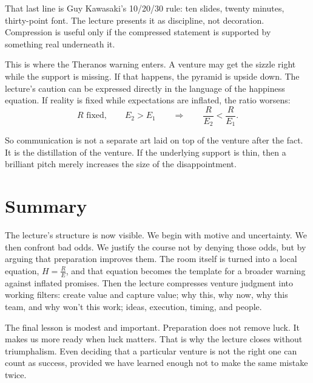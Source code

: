 That last line is Guy Kawasaki's 10/20/30 rule: ten slides, twenty minutes, thirty-point font. The lecture presents it as discipline, not decoration. Compression is useful only if the compressed statement is supported by something real underneath it.

This is where the Theranos warning enters. A venture may get the sizzle right while the support is missing. If that happens, the pyramid is upside down. The lecture's caution can be expressed directly in the language of the happiness equation. If reality is fixed while expectations are inflated, the ratio worsens:
\begin{equation}
R \text{ fixed},\qquad E_2>E_1 \qquad \Longrightarrow \qquad \frac{R}{E_2}<\frac{R}{E_1}.
\end{equation}

So communication is not a separate art laid on top of the venture after the fact. It is the distillation of the venture. If the underlying support is thin, then a brilliant pitch merely increases the size of the disappointment.

\section{Summary}

The lecture's structure is now visible. We begin with motive and uncertainty. We then confront bad odds. We justify the course not by denying those odds, but by arguing that preparation improves them. The room itself is turned into a local equation, \(H=\frac{R}{E}\), and that equation becomes the template for a broader warning against inflated promises. Then the lecture compresses venture judgment into working filters: create value and capture value; why this, why now, why this team, and why won't this work; ideas, execution, timing, and people.

The final lesson is modest and important. Preparation does not remove luck. It makes us more ready when luck matters. That is why the lecture closes without triumphalism. Even deciding that a particular venture is not the right one can count as success, provided we have learned enough not to make the same mistake twice.